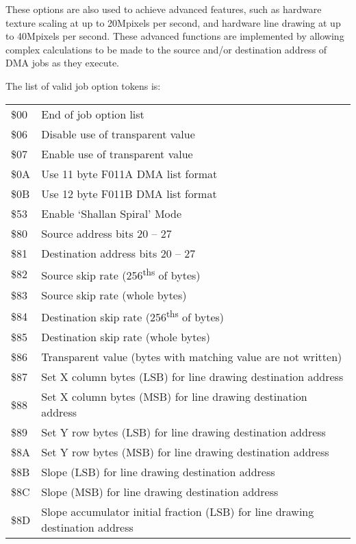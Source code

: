 These options are also used to achieve advanced features, such as hardware
texture scaling at up to 20Mpixels per second, and hardware line drawing
at up to 40Mpixels per second. These advanced functions are implemented
by allowing complex calculations to be made to the source and/or destination
address of DMA jobs as they execute.

The list of valid job option tokens is:

\begin{center}
\begin{tabular}{|>{\centering\arraybackslash}p{1.5cm}|p{10cm}|}
  \hline
  \$00 & End of job option list \\
  \$06 & Disable use of transparent value \\
  \$07 & Enable use of transparent value \\
  \$0A & Use 11 byte F011A DMA list format \\
  \$0B & Use 12 byte F011B DMA list format \\
  \$53 & Enable `Shallan Spiral' Mode \\
  \$80 & Source address bits 20 -- 27 \\
  \$81 & Destination address bits 20 -- 27 \\
  \$82 & Source skip rate (256\textsuperscript{ths} of bytes) \\
  \$83 & Source skip rate (whole bytes) \\
  \$84 & Destination skip rate (256\textsuperscript{ths} of bytes) \\
  \$85 & Destination skip rate (whole bytes) \\
  \$86 & Transparent value (bytes with matching value are not written) \\
  \$87 & Set X column bytes (LSB) for line drawing destination address \\
  \$88 & Set X column bytes (MSB) for line drawing destination address \\
  \$89 & Set Y row bytes (LSB) for line drawing destination address \\
  \$8A & Set Y row bytes (MSB) for line drawing destination address \\
  \$8B & Slope (LSB) for line drawing destination address \\
  \$8C & Slope (MSB) for line drawing destination address \\
  \$8D & Slope accumulator initial fraction (LSB) for line drawing destination address \\

\end{tabular}
\end{center}
